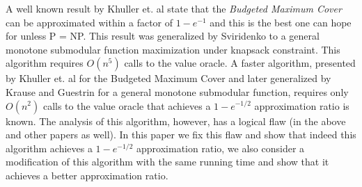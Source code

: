 A well known result by Khuller et. al state that the \emph{Budgeted Maximum Cover}
can be approximated within a factor of $1-e^{-1}$ and this is the best one can hope for unless 
P = NP.
This result was generalized by Sviridenko to a general monotone submodular function maximization
under knapsack constraint. 
This algorithm requires $O(n^5)$ calls to the value oracle.
A faster algorithm, presented by Khuller et. al for the Budgeted Maximum Cover and later 
generalized by Krause and Guestrin for a general monotone submodular function, 
requires only $O(n^2)$ calls to the value oracle that 
achieves a $1-e^{-1/2}$ approximation ratio is known.
The analysis of this algorithm, however, has a logical flaw 
(in the above and other papers as well). 
In this paper we fix this flaw and show that indeed this algorithm achieves a $1-e^{-1/2}$ 
approximation ratio, we also consider a modification of this algorithm with 
the same running time and show that it achieves a better approximation ratio.  
  
